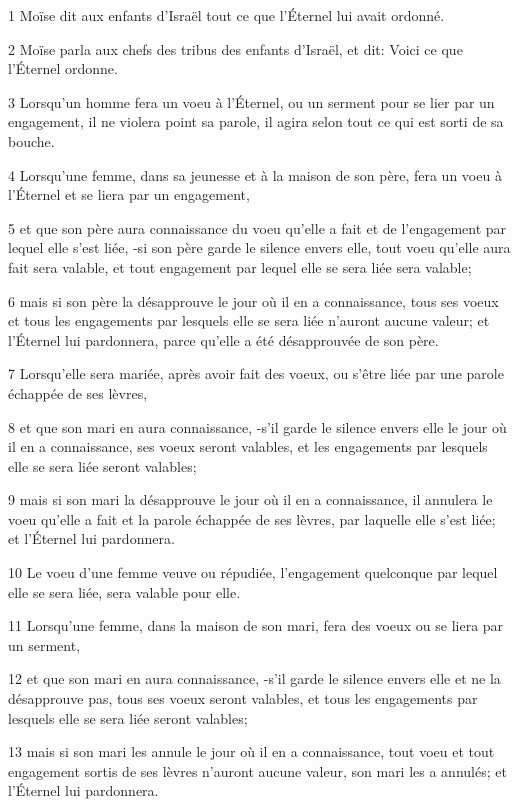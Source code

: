 \par 1 Moïse dit aux enfants d'Israël tout ce que l'Éternel lui avait ordonné.
\par 2 Moïse parla aux chefs des tribus des enfants d'Israël, et dit: Voici ce que l'Éternel ordonne.
\par 3 Lorsqu'un homme fera un voeu à l'Éternel, ou un serment pour se lier par un engagement, il ne violera point sa parole, il agira selon tout ce qui est sorti de sa bouche.
\par 4 Lorsqu'une femme, dans sa jeunesse et à la maison de son père, fera un voeu à l'Éternel et se liera par un engagement,
\par 5 et que son père aura connaissance du voeu qu'elle a fait et de l'engagement par lequel elle s'est liée, -si son père garde le silence envers elle, tout voeu qu'elle aura fait sera valable, et tout engagement par lequel elle se sera liée sera valable;
\par 6 mais si son père la désapprouve le jour où il en a connaissance, tous ses voeux et tous les engagements par lesquels elle se sera liée n'auront aucune valeur; et l'Éternel lui pardonnera, parce qu'elle a été désapprouvée de son père.
\par 7 Lorsqu'elle sera mariée, après avoir fait des voeux, ou s'être liée par une parole échappée de ses lèvres,
\par 8 et que son mari en aura connaissance, -s'il garde le silence envers elle le jour où il en a connaissance, ses voeux seront valables, et les engagements par lesquels elle se sera liée seront valables;
\par 9 mais si son mari la désapprouve le jour où il en a connaissance, il annulera le voeu qu'elle a fait et la parole échappée de ses lèvres, par laquelle elle s'est liée; et l'Éternel lui pardonnera.
\par 10 Le voeu d'une femme veuve ou répudiée, l'engagement quelconque par lequel elle se sera liée, sera valable pour elle.
\par 11 Lorsqu'une femme, dans la maison de son mari, fera des voeux ou se liera par un serment,
\par 12 et que son mari en aura connaissance, -s'il garde le silence envers elle et ne la désapprouve pas, tous ses voeux seront valables, et tous les engagements par lesquels elle se sera liée seront valables;
\par 13 mais si son mari les annule le jour où il en a connaissance, tout voeu et tout engagement sortis de ses lèvres n'auront aucune valeur, son mari les a annulés; et l'Éternel lui pardonnera.
